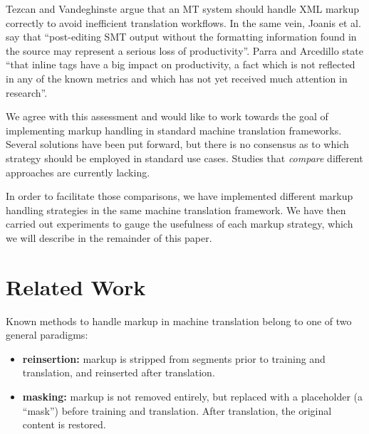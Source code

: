 \documentclass[11pt,letterpaper]{article}
\begin{document}
Tezcan and Vandeghinste  argue that an MT system should handle XML markup correctly to avoid inefficient translation workflows. In the same vein, Joanis et al.  say that ``post-editing SMT output without the formatting information found in the source may represent a serious loss of productivity''. Parra and Arcedillo  state ``that inline tags have a big impact on productivity, a fact which is not reflected in any of the known metrics and which has not yet received much attention in research''.

We agree with this assessment and would like to work towards the goal of implementing markup handling in standard machine translation frameworks. Several solutions have been put forward, but there is no consensus as to which strategy should be employed in standard use cases. Studies that \textit{compare} different approaches are currently lacking.

In order to facilitate those comparisons, we have implemented different markup handling strategies in the same machine translation framework. We have then carried out experiments to gauge the usefulness of each markup strategy, which we will describe in the remainder of this paper.








\section{Related Work}

Known methods to handle markup in machine translation belong to one of two general paradigms:

\begin{itemize}
\item \textbf{reinsertion:} markup is stripped from segments prior to training and translation, and reinserted after translation.
\item \textbf{masking:} markup is not removed entirely, but replaced with a placeholder (a ``mask'') before training and translation. After translation, the original content is restored.
\end{itemize}
\end{document}
